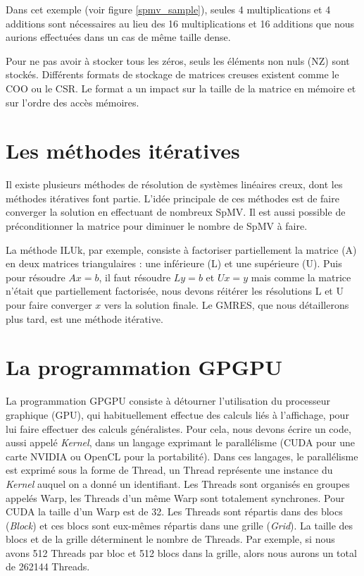 \documentclass[a4paper,11pt]{report}
\begin{document}
  Dans cet exemple (voir figure \ref{spmv_sample}), seules 4 multiplications et 4 additions sont
  nécessaires au lieu des 16 multiplications et 16 additions que nous
  aurions effectuées dans un cas de même taille dense.
  
  Pour ne pas avoir à stocker tous les zéros, seuls les éléments non
  nuls (NZ) sont stockés. Différents formats de stockage de matrices
  creuses existent comme le COO ou le CSR.
  Le format a un impact sur la taille de la matrice en mémoire et sur
  l'ordre des accès mémoires.

 \section{Les méthodes itératives}
  Il existe plusieurs méthodes de résolution de systèmes linéaires
  creux, dont les méthodes itératives font partie. L'idée principale de
  ces méthodes est de faire converger la solution en effectuant de
  nombreux SpMV\cite{Saad96IMSLS}. Il est aussi possible de
  préconditionner la matrice pour diminuer le nombre de SpMV à faire.
  
  La méthode ILUk, par exemple, consiste à factoriser partiellement la
  matrice (A) en deux matrices triangulaires : une inférieure (L) et une supérieure
  (U).
  Puis pour résoudre $Ax=b$, il faut résoudre $Ly=b$ et $Ux=y$ mais comme la
  matrice n'était que partiellement factorisée, nous devons réitérer
  les résolutions L et U pour faire converger $x$ vers la solution
  finale. Le GMRES, que nous détaillerons plus tard, est une méthode
  itérative.

 \section{La programmation GPGPU}
  La programmation GPGPU consiste à détourner l'utilisation du
  processeur graphique (GPU), qui habituellement effectue des calculs
  liés à l'affichage, pour lui faire effectuer des calculs
  généralistes. Pour cela, nous devons écrire 
  un code, aussi appelé \textit{Kernel}, dans un langage exprimant le
  parallélisme (CUDA \cite{cuda11} pour une carte NVIDIA ou OpenCL
  \cite{opencl10} pour la portabilité). Dans ces langages, le
  parallélisme est exprimé sous la forme de Thread, un Thread
  représente une instance du \textit{Kernel} auquel on a donné un identifiant.
  Les Threads sont organisés en groupes appelés Warp, les Threads
  d'un même Warp sont totalement synchrones. Pour CUDA la taille d'un
  Warp est de 32. Les Threads sont répartis
  dans des blocs (\textit{Block}) et ces blocs sont eux-mêmes répartis dans une
  grille (\textit{Grid}). La taille des blocs et de la grille déterminent le
  nombre de Threads. Par exemple, si nous avons 512 Threads par bloc et
  512 blocs dans la grille, alors nous aurons un total de 262144 Threads.
  
\end{document}
